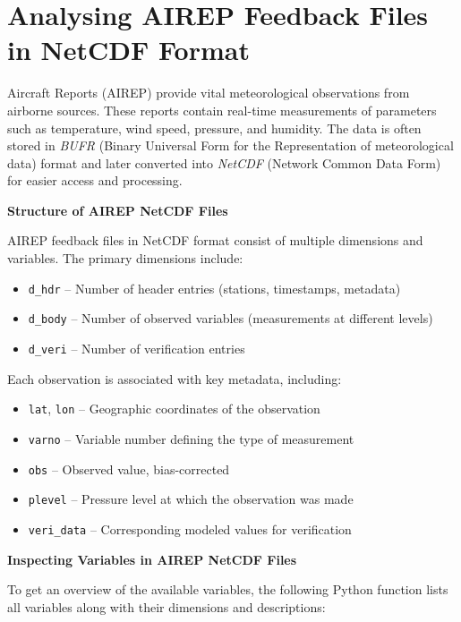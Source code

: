 \section{Analysing AIREP Feedback Files in NetCDF Format}

Aircraft Reports (AIREP) provide vital meteorological observations from airborne sources. These reports contain real-time measurements of parameters such as temperature, wind speed, pressure, and humidity. The data is often stored in \emph{BUFR} (Binary Universal Form for the Representation of meteorological data) format and later converted into \emph{NetCDF} (Network Common Data Form) for easier access and processing.

\textbf{Structure of AIREP NetCDF Files}

AIREP feedback files in NetCDF format consist of multiple dimensions and variables. The primary dimensions include:

\begin{itemize}
    \item \texttt{d\_hdr} -- Number of header entries (stations, timestamps, metadata)
    \item \texttt{d\_body} -- Number of observed variables (measurements at different levels)
    \item \texttt{d\_veri} -- Number of verification entries
\end{itemize}

Each observation is associated with key metadata, including:

\begin{itemize}
    \item \texttt{lat}, \texttt{lon} -- Geographic coordinates of the observation
    \item \texttt{varno} -- Variable number defining the type of measurement
    \item \texttt{obs} -- Observed value, bias-corrected
    \item \texttt{plevel} -- Pressure level at which the observation was made
    \item \texttt{veri\_data} -- Corresponding modeled values for verification
\end{itemize}

\textbf{Inspecting Variables in AIREP NetCDF Files}

To get an overview of the available variables, the following Python function lists all variables along with their dimensions and descriptions:

